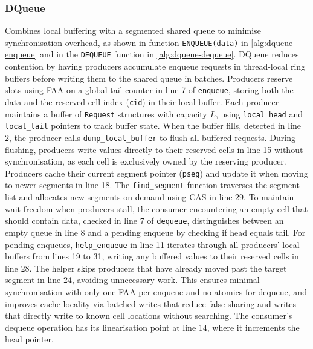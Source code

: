 \subsubsection{DQueue}
Combines local buffering with a segmented shared queue to minimise synchronisation overhead, as shown in function \texttt{ENQUEUE(data)} in \cref{alg:dqueue-enqueue} and in the \texttt{DEQUEUE} function in \cref{alg:dqueue-dequeue}. DQueue reduces contention by having producers accumulate enqueue requests in thread-local ring buffers before writing them to the shared queue in batches. Producers reserve slots using \ac{FAA} on a global tail counter in line 7 of \texttt{enqueue}, storing both the data and the reserved cell index (\texttt{cid}) in their local buffer. Each producer maintains a buffer of \texttt{Request} structures with capacity $L$, using \texttt{local\_head} and \texttt{local\_tail} pointers to track buffer state. When the buffer fills, detected in line 2, the producer calls \texttt{dump\_local\_buffer} to flush all buffered requests. During flushing, producers write values directly to their reserved cells in line 15 without synchronisation, as each cell is exclusively owned by the reserving producer. Producers cache their current segment pointer (\texttt{pseg}) and update it when moving to newer segments in line 18. The \texttt{find\_segment} function traverses the segment list and allocates new segments on-demand using \ac{CAS} in line 29. To maintain wait-freedom when producers stall, the consumer encountering an empty cell that should contain data, checked in line 7 of \texttt{dequeue}, distinguishes between an empty queue in line 8 and a pending enqueue by checking if head equals tail. For pending enqueues, \texttt{help\_enqueue} in line 11 iterates through all producers' local buffers from lines 19 to 31, writing any buffered values to their reserved cells in line 28. The helper skips producers that have already moved past the target segment in line 24, avoiding unnecessary work. This ensures minimal synchronisation with only one \ac{FAA} per enqueue and no atomics for dequeue, and improves cache locality via batched writes that reduce false sharing and writes that directly write to known cell locations without searching. The consumer's dequeue operation has its linearisation point at line 14, where it increments the head pointer. \cite{WangCacheCoherent}

